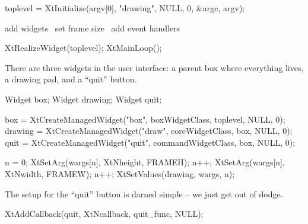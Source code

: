 \nwenddocs{}\endmoddef
toplevel = XtInitialize(argv[0], "drawing", NULL, 0, &argc, argv);

\LA{}add widgets~{\nwtagstyle{}}\RA{}
\LA{}set frame size~{\nwtagstyle{}}\RA{}
\LA{}add event handlers~{\nwtagstyle{}}\RA{}

XtRealizeWidget(toplevel);
XtMainLoop();
\nwendcode{}\nwdocspar

There are three widgets in the user interface: a parent box where
everything lives, a drawing pad, and a ``quit'' button.

\nwenddocs{}\plusendmoddef
Widget box;
Widget drawing;
Widget quit;
\nwendcode{}\nwdocspar

\nwenddocs{}\endmoddef
box     = XtCreateManagedWidget("box",  boxWidgetClass,  toplevel, NULL, 0);
drawing = XtCreateManagedWidget("draw", coreWidgetClass,    box, NULL, 0);
quit    = XtCreateManagedWidget("quit", commandWidgetClass, box, NULL, 0);
\nwendcode{}\nwdocspar

\nwenddocs{}\endmoddef
n = 0;
XtSetArg(wargs[n], XtNheight, FRAMEH); n++;
XtSetArg(wargs[n], XtNwidth,  FRAMEW); n++;
XtSetValues(drawing, wargs, n);

\nwendcode{}\nwdocspar

The setup for the ``quit'' button is darned simple -- we just get
out of dodge.

\nwenddocs{}\endmoddef
XtAddCallback(quit, XtNcallback, quit_func, NULL);
\nwendcode{}\nwdocspar

